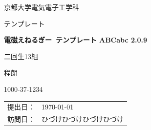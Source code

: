 \begin{titlepage}
	\centering
    {
        {\Large 京都大学電気電子工学科\par}
        \vspace{1cm}
        {\Large テンプレート\par}
        \vspace{1.5cm}
        {\HUGE\bfseries\udpgoth\myB\lato 電磁えねるぎー\ テンプレート ABCabc 2.0.9\par}
        \vspace{2cm}
        {
            \Large
            二回生13組\par
            程朗\par
            1000-37-1234\par
        }

        \vfill

        {
            \begin{table}[H]
                \centering
                \large
                \begin{tabular}{ll}
                    提出日： & \today   \\
                    訪問日： & ひづけひづけひづけひづけ
                \end{tabular}
            \end{table}
        }
    }

\end{titlepage}
